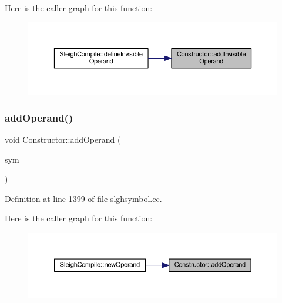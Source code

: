 Here is the caller graph for this function\+:
\nopagebreak
\begin{figure}[H]
\begin{center}
\leavevmode
\includegraphics[width=350pt]{class_constructor_ad99b2273a274feb05ff73a2e71ed72c0_icgraph}
\end{center}
\end{figure}
\mbox{\label{class_constructor_a68d3673f0b2a139ab0690b066fd8b3dd}} 
\subsubsection{\texorpdfstring{addOperand()}{addOperand()}}
{\footnotesize\ttfamily void Constructor\+::add\+Operand (\begin{DoxyParamCaption}\item[{\mbox{\hyperlink{class_operand_symbol}{Operand\+Symbol}} $\ast$}]{sym }\end{DoxyParamCaption})}



Definition at line 1399 of file slghsymbol.\+cc.

Here is the caller graph for this function\+:
\nopagebreak
\begin{figure}[H]
\begin{center}
\leavevmode
\includegraphics[width=350pt]{class_constructor_a68d3673f0b2a139ab0690b066fd8b3dd_icgraph}
\end{center}
\end{figure}
\mbox{\label{class_constructor_afa84cb0958349a7e804bc269a83ac688}} 
